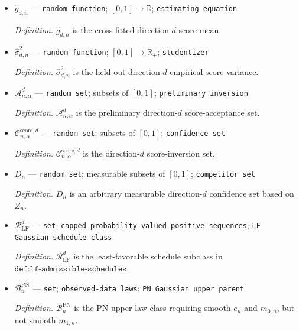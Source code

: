 \documentclass{article}
\begin{document}
\begin{itemize}
  \par\smallskip\noindent\emph{Definition.} \(\mathcal K_{\mathrm{LF}}\) contains the admissible lower-information constants paired with the sharp derived coefficient \(C_G=\varepsilon^{-1}\).
  \item \(\widehat g_{d,n}\) --- \texttt{random function}; \([0,1]\to\mathbb R\); \texttt{estimating equation}
  \par\smallskip\noindent\emph{Definition.} \(\widehat g_{d,n}\) is the cross-fitted direction-\(d\) score mean.
  \item \(\widehat\sigma_{d,n}^2\) --- \texttt{random function}; \([0,1]\to\mathbb R_+\); \texttt{studentizer}
  \par\smallskip\noindent\emph{Definition.} \(\widehat\sigma_{d,n}^2\) is the held-out direction-\(d\) empirical score variance.
  \item \(\mathcal A_{n,\alpha}^d\) --- \texttt{random set}; subsets of \([0,1]\); \texttt{preliminary inversion}
  \par\smallskip\noindent\emph{Definition.} \(\mathcal A_{n,\alpha}^d\) is the preliminary direction-\(d\) score-acceptance set.
  \item \(\mathcal C_{n,\alpha}^{\mathrm{score},d}\) --- \texttt{random set}; subsets of \([0,1]\); \texttt{confidence set}
  \par\smallskip\noindent\emph{Definition.} \(\mathcal C_{n,\alpha}^{\mathrm{score},d}\) is the direction-\(d\) score-inversion set.
  \item \(D_n\) --- \texttt{random set}; measurable subsets of \([0,1]\); \texttt{competitor set}
  \par\smallskip\noindent\emph{Definition.} \(D_n\) is an arbitrary measurable direction-\(d\) confidence set based on \(Z_n\).
  \item \(\mathcal R_{\mathrm{LF}}^d\) --- \texttt{set}; \texttt{capped probability-\allowbreak{}valued positive sequences}; \texttt{LF Gaussian schedule class}
  \par\smallskip\noindent\emph{Definition.} \(\mathcal R_{\mathrm{LF}}^d\) is the least-favorable schedule subclass in \(\texttt{def:lf-admissible-schedules}\).
  \item \(\mathcal B_n^{\mathrm{PN}}\) --- \texttt{set}; \texttt{observed-\allowbreak{}data laws}; \texttt{PN Gaussian upper parent}
  \par\smallskip\noindent\emph{Definition.} \(\mathcal B_n^{\mathrm{PN}}\) is the PN upper law class requiring smooth \(e_n\) and \(m_{0,n}\), but not smooth \(m_{1,n}\).

\end{itemize}
\end{document}
